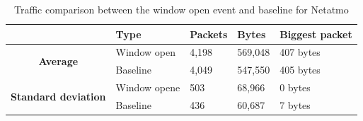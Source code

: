 \begin{table}[H]
    \centering
    \caption{Traffic comparison between the window open event and baseline for Netatmo}
    \begin{tabular}{c|l|l|l|l|}
        \cline{2-5}
        \multicolumn{1}{l|}{}                                              & \textbf{Type} & \textbf{Packets} & \textbf{Bytes} & \textbf{Biggest packet} \\ \hline
        \multicolumn{1}{|c|}{\multirow{2}{*}{\textbf{Average}}}            & Window open         & 4,198            & 569,048        & 407 bytes               \\ \cline{2-5} 
        \multicolumn{1}{|c|}{}                                             & Baseline      & 4,049            & 547,550        & 405 bytes                \\ \hline
        \multicolumn{1}{|c|}{\multirow{2}{*}{\textbf{Standard deviation}}} & Window opene         & 503              & 68,966         & 0 bytes                 \\ \cline{2-5} 
        \multicolumn{1}{|c|}{}                                             & Baseline      & 436              & 60,687         & 7 bytes               \\ \hline          
    \end{tabular}
    \label{tab:NetatmoComparingBaselineAndWindowCalculations}
\end{table}

